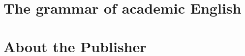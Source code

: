 \documentclass[oneside]{book}
\numberwithin{equation}{section}
\begin{document}

\chapter{The grammar of academic English}


\chapter{About the Publisher}



\printbibliography[heading=bibintoc]
\end{document}

